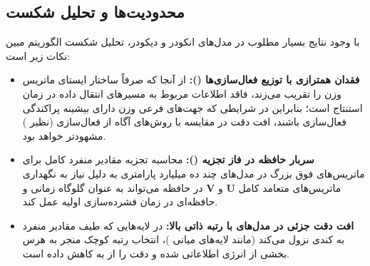 \subsection{محدودیت‌ها و تحلیل شکست}
با وجود نتایج بسیار مطلوب در مدل‌های انکودر و دیکودر، تحلیل شکست الگوریتم مبین نکات زیر است:
\begin{itemize}
    \item \textbf{فقدان همترازی با توزیع فعال‌سازی‌ها ():} از آنجا که  صرفاً ساختار ایستای ماتریس وزن را تقریب می‌زند، فاقد اطلاعات مربوط به مسیرهای انتقال داده در زمان استنتاج است؛ بنابراین در شرایطی که جهت‌های فرعی وزن دارای بیشینه پراکندگی فعال‌سازی باشند، افت دقت در مقایسه با روش‌های آگاه از فعال‌سازی (نظیر ) مشهودتر خواهد بود.
    \item \textbf{سربار حافظه در فاز تجزیه ():} محاسبه تجزیه مقادیر منفرد کامل برای ماتریس‌های فوق بزرگ در مدل‌های چند ده میلیارد پارامتری به دلیل نیاز به نگهداری ماتریس‌های متعامد کامل $\mathbf{U}$ و $\mathbf{V}$ در حافظه  می‌تواند به عنوان گلوگاه زمانی و حافظه‌ای در زمان فشرده‌سازی اولیه عمل کند.
    \item \textbf{افت دقت جزئی در مدل‌های با رتبه ذاتی بالا:} در لایه‌هایی که طیف مقادیر منفرد به کندی نزول می‌کند (مانند لایه‌های میانی )، انتخاب رتبه کوچک منجر به هرس بخشی از انرژی اطلاعاتی شده و دقت را از  به  کاهش داده است.
\end{itemize}
